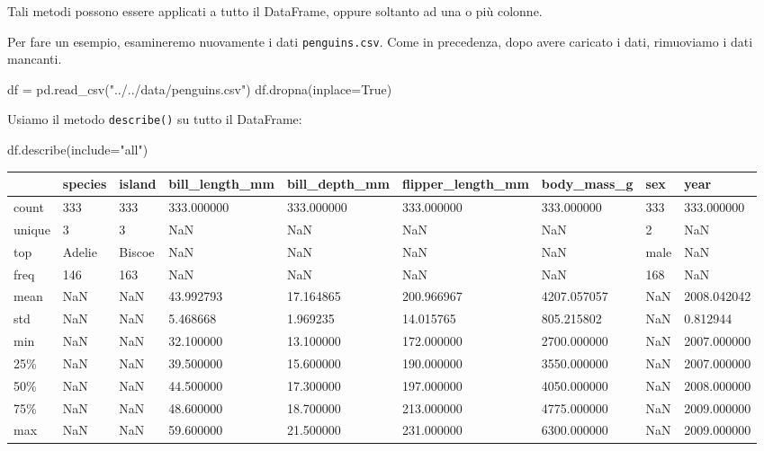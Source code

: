 \documentclass[
  letterpaper,
  krantz2]{{[}./krantz{]}}
\newenvironment{Shaded}{\begin{snugshade}}{\end{snugshade}}
\newcommand{\NormalTok}[1]{\textcolor[rgb]{0.00,0.23,0.31}{#1}}
\newcommand{\OperatorTok}[1]{\textcolor[rgb]{0.37,0.37,0.37}{#1}}
\newcommand{\StringTok}[1]{\textcolor[rgb]{0.13,0.47,0.30}{#1}}
\newcommand{\VariableTok}[1]{\textcolor[rgb]{0.07,0.07,0.07}{#1}}
\begin{document}
Tali metodi possono essere applicati a tutto il DataFrame, oppure
soltanto ad una o più colonne.

Per fare un esempio, esamineremo nuovamente i dati
\texttt{penguins.csv}. Come in precedenza, dopo avere caricato i dati,
rimuoviamo i dati mancanti.

\begin{Shaded}
\begin{Highlighting}[]
\NormalTok{df }\OperatorTok{=}\NormalTok{ pd.read\_csv(}\StringTok{"../../data/penguins.csv"}\NormalTok{)}
\NormalTok{df.dropna(inplace}\OperatorTok{=}\VariableTok{True}\NormalTok{)}
\end{Highlighting}
\end{Shaded}

Usiamo il metodo \texttt{describe()} su tutto il DataFrame:

\begin{Shaded}
\begin{Highlighting}[]
\NormalTok{df.describe(include}\OperatorTok{=}\StringTok{"all"}\NormalTok{)}
\end{Highlighting}
\end{Shaded}

\begin{longtable}[]{@{}lllllllll@{}}
\toprule\noalign{}
& species & island & bill\_length\_mm & bill\_depth\_mm &
flipper\_length\_mm & body\_mass\_g & sex & year \\
\midrule\noalign{}
\endhead
\bottomrule\noalign{}
\endlastfoot
count & 333 & 333 & 333.000000 & 333.000000 & 333.000000 & 333.000000 &
333 & 333.000000 \\
unique & 3 & 3 & NaN & NaN & NaN & NaN & 2 & NaN \\
top & Adelie & Biscoe & NaN & NaN & NaN & NaN & male & NaN \\
freq & 146 & 163 & NaN & NaN & NaN & NaN & 168 & NaN \\
mean & NaN & NaN & 43.992793 & 17.164865 & 200.966967 & 4207.057057 &
NaN & 2008.042042 \\
std & NaN & NaN & 5.468668 & 1.969235 & 14.015765 & 805.215802 & NaN &
0.812944 \\
min & NaN & NaN & 32.100000 & 13.100000 & 172.000000 & 2700.000000 & NaN
& 2007.000000 \\
25\% & NaN & NaN & 39.500000 & 15.600000 & 190.000000 & 3550.000000 &
NaN & 2007.000000 \\
50\% & NaN & NaN & 44.500000 & 17.300000 & 197.000000 & 4050.000000 &
NaN & 2008.000000 \\
75\% & NaN & NaN & 48.600000 & 18.700000 & 213.000000 & 4775.000000 &
NaN & 2009.000000 \\
max & NaN & NaN & 59.600000 & 21.500000 & 231.000000 & 6300.000000 & NaN
& 2009.000000 \\
\end{longtable}
\end{document}

